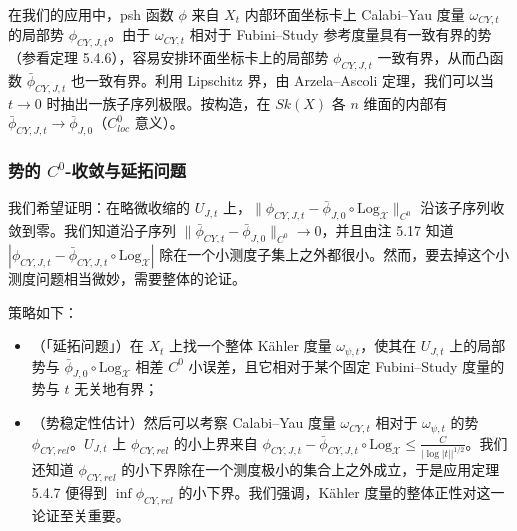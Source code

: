 在我们的应用中，psh 函数 $\phi$ 来自 $X_t$ 内部环面坐标卡上 Calabi--Yau 度量 $\omega_{CY,t}$ 的局部势 $\phi_{CY,J,t}$。由于 $\omega_{CY,t}$ 相对于 Fubini--Study 参考度量具有一致有界的势（参看定理 5.4.6），容易安排环面坐标卡上的局部势 $\phi_{CY,J,t}$ 一致有界，从而凸函数 $\bar\phi_{CY,J,t}$ 也一致有界。利用 Lipschitz 界，由 Arzela--Ascoli 定理，我们可以当 $t\to 0$ 时抽出一族子序列极限。按构造，在 $Sk(X)$ 各 $n$ 维面的内部有 $\bar\phi_{CY,J,t}\to\bar\phi_{J,0}$（$C^0_{loc}$ 意义）。


\subsubsection{势的 $C^0$-收敛与延拓问题}
我们希望证明：在略微收缩的 $U_{J,t}$ 上，$\|\phi_{CY,J,t}-\bar\phi_{J,0}\circ\mathrm{Log}_{\mathcal X}\|_{C^0}$ 沿该子序列收敛到零。我们知道沿子序列 $\|\bar\phi_{CY,t}-\bar\phi_{J,0}\|_{C^0}\to 0$，并且由注 5.17 知道 $|\phi_{CY,J,t}-\bar\phi_{CY,J,t}\circ\mathrm{Log}_{\mathcal X}|$ 除在一个小测度子集上之外都很小。然而，要去掉这个小测度问题相当微妙，需要整体的论证。


策略如下：
\begin{itemize}
\item （「延拓问题」）在 $X_t$ 上找一个整体 Kähler 度量 $\omega_{\psi,t}$，使其在 $U_{J,t}$ 上的局部势与 $\bar\phi_{J,0}\circ\mathrm{Log}_{\mathcal X}$ 相差 $C^0$ 小误差，且它相对于某个固定 Fubini--Study 度量的势与 $t$ 无关地有界；
\item （势稳定性估计）然后可以考察 Calabi--Yau 度量 $\omega_{CY,t}$ 相对于 $\omega_{\psi,t}$ 的势 $\phi_{CY,rel}$。$U_{J,t}$ 上 $\phi_{CY,rel}$ 的小上界来自 $\phi_{CY,J,t}-\bar\phi_{CY,J,t}\circ\mathrm{Log}_{\mathcal X}\le\frac{C}{|\log|t||^{1/2}}$。我们还知道 $\phi_{CY,rel}$ 的小下界除在一个测度极小的集合上之外成立，于是应用定理 5.4.7 便得到 $\inf\phi_{CY,rel}$ 的小下界。我们强调，Kähler 度量的整体正性对这一论证至关重要。
\end{itemize}

